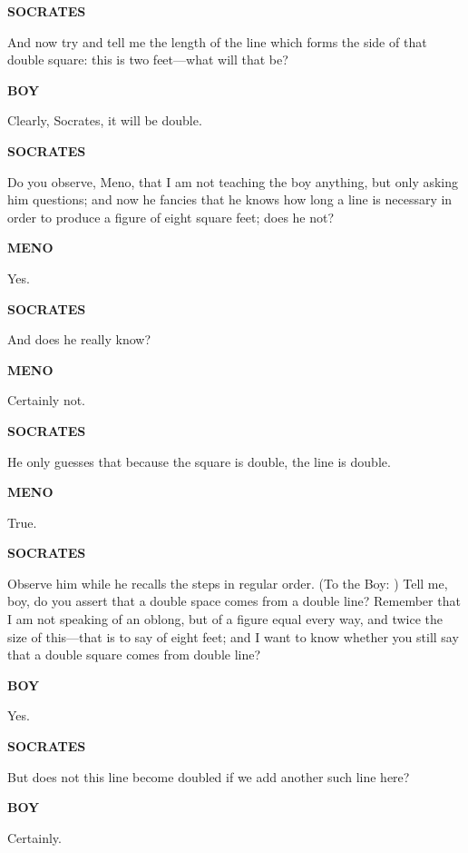 \documentclass[11pt,letter]{article}
\begin{document}
\par \textbf{SOCRATES}
\par   And now try and tell me the length of the line which forms the side of that double square:  this is two feet—what will that be?

\par \textbf{BOY}
\par   Clearly, Socrates, it will be double.

\par \textbf{SOCRATES}
\par   Do you observe, Meno, that I am not teaching the boy anything, but only asking him questions; and now he fancies that he knows how long a line is necessary in order to produce a figure of eight square feet; does he not?

\par \textbf{MENO}
\par   Yes.

\par \textbf{SOCRATES}
\par   And does he really know?

\par \textbf{MENO}
\par   Certainly not.

\par \textbf{SOCRATES}
\par   He only guesses that because the square is double, the line is double.

\par \textbf{MENO}
\par   True.

\par \textbf{SOCRATES}
\par   Observe him while he recalls the steps in regular order. (To the Boy: ) Tell me, boy, do you assert that a double space comes from a double line? Remember that I am not speaking of an oblong, but of a figure equal every way, and twice the size of this—that is to say of eight feet; and I want to know whether you still say that a double square comes from double line?

\par \textbf{BOY}
\par   Yes.

\par \textbf{SOCRATES}
\par   But does not this line become doubled if we add another such line here?

\par \textbf{BOY}
\par   Certainly.
\end{document}
